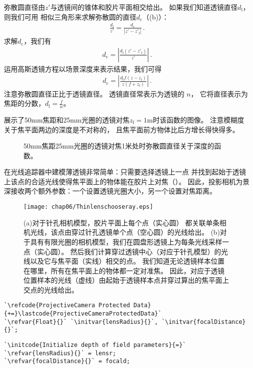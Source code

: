 弥散圆直径由$z'$与透镜间的锥体和胶片平面相交给出。
如果我们知道透镜直径$d_{\mathrm{l}}$，则我们可用
相似三角形来求解弥散圆的直径$d_{\mathrm{c}}$（(b)）：
\begin{align*}
    \frac{d_{\mathrm{l}}}{z'}=\frac{d_{\mathrm{c}}}{|z'-z'_{\mathrm{f}}|}\, .
\end{align*}
求解$d_{\mathrm{c}}$，我们有
\begin{align*}
    d_{\mathrm{c}}=\left|\frac{d_{\mathrm{l}}(z'-z'_{\mathrm{f}})}{z'}\right|\, .
\end{align*}
运用高斯透镜方程以场景深度来表示结果，我们可得
\begin{align*}
    d_{\mathrm{c}}=\left|\frac{d_{\mathrm{l}}f(z-z_{\mathrm{f}})}{z(f+z_{\mathrm{f}})}\right|\, .
\end{align*}
注意弥散圆直径正比于透镜直径。
透镜直径常表示为透镜的
$n$，
它将直径表示为焦距的分数，$\displaystyle d_{\mathrm{l}}=\frac{f}{n}$。

展示了50mm焦距和25mm光圈的透镜对焦$z_{\mathrm{f}}=1$m时该函数的图像。
注意模糊度关于焦平面两边的深度是不对称的，
且焦平面前方物体比后方增长得快得多。
\begin{figure}[htbp]
    \centering
    \caption{50mm焦距25mm光圈的透镜对焦1米处时弥散圆直径关于深度的函数。}
    \label{fig:6.11}
\end{figure}

在光线追踪器中建模薄透镜非常简单：只需要选择透镜上一点
并找到起始于透镜上该点的合适光线使得焦平面上的物体能在胶片上对焦（）。
因此，投影相机为景深接收两个额外参数：一个设置透镜光圈大小，另一个设置对焦距离。
\begin{figure}[htbp]
    \centering\texttt{[image: chap06/Thinlenschooseray.eps]}
    \caption{(a)对于针孔相机模型，胶片平面上每个点（实心圆）
        都关联单条相机光线，该点由穿过针孔透镜单个点（空心圆）的光线给出。
        (b)对于具有有限光圈的相机模型，我们在圆盘形透镜上为每条光线采样一点（实心圆）。
        然后我们计算穿过透镜中心（对应于针孔模型）的光线以及它与焦平面（实线）相交的点。
        我们知道无论透镜样本位置在哪里，所有在焦平面上的物体都一定对准焦。
        因此，对应于透镜位置样本的光线（虚线）由起始于透镜样本点并穿过算出的焦平面上交点的光线给出。}
    \label{fig:6.12}
\end{figure}

\begin{lstlisting}
`\refcode{ProjectiveCamera Protected Data}{+=}\lastcode{ProjectiveCameraProtectedData}`
`\refvar{Float}{}` `\initvar{lensRadius}{}`, `\initvar{focalDistance}{}`;
\end{lstlisting}
\begin{lstlisting}
`\initcode{Initialize depth of field parameters}{=}`
`\refvar{lensRadius}{}` = lensr;
`\refvar{focalDistance}{}` = focald;
\end{lstlisting}

